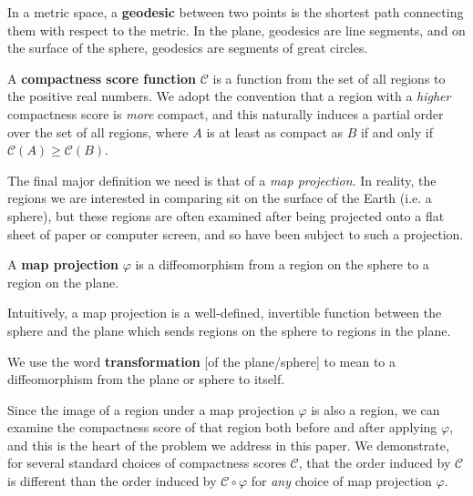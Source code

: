 \begin{definition}
	In a metric space, a \textbf{geodesic} between two points is the shortest path connecting them with respect to the metric.
	In the plane, geodesics are line segments, and on the surface of the sphere, geodesics are segments of great circles.
\end{definition}

\begin{definition}
  A \textbf{compactness score function} $\mathcal{C}$ is a function from
  the set of all regions to the positive real numbers.  We adopt the
  convention that a region with a \textit{higher} compactness score is
  \textit{more} compact, and this naturally induces a partial order over
  the set of all regions, where $A$ is at least as compact as $B$ if and
  only if $\mathcal{C}(A)\geq \mathcal{C}(B)$.
\end{definition}

The final major definition we need is that of a \textit{map
projection}.  In reality, the regions we are interested in comparing
sit on the surface of the Earth (i.e. a sphere), but these regions are
often examined after being projected onto a flat sheet of paper or
computer screen, and so have been subject to such a projection.

\begin{definition}
  A \textbf{map projection} $\varphi$ is a 
  diffeomorphism from a region on the sphere to a region on the 
  plane. 
\end{definition}

Intuitively, a map projection is a well-defined, invertible function between the sphere and the plane which sends regions on the sphere to regions in the plane.

\begin{definition}
  We use the word \textbf{transformation} [of the plane/sphere] to mean
  to a diffeomorphism from the plane or sphere to itself.
\end{definition}

Since the image of a region under a map projection $\varphi$ is also
a region, we can examine the compactness score of that region both 
before and after applying $\varphi$, and this is the heart of the
problem we address in this paper.  We demonstrate, for several
standard choices of compactness scores $\mathcal{C}$, that the order
induced by $\mathcal{C}$ is different than the order induced by
$\mathcal{C}\circ\varphi$ for \textit{any} choice of map projection
$\varphi$.

